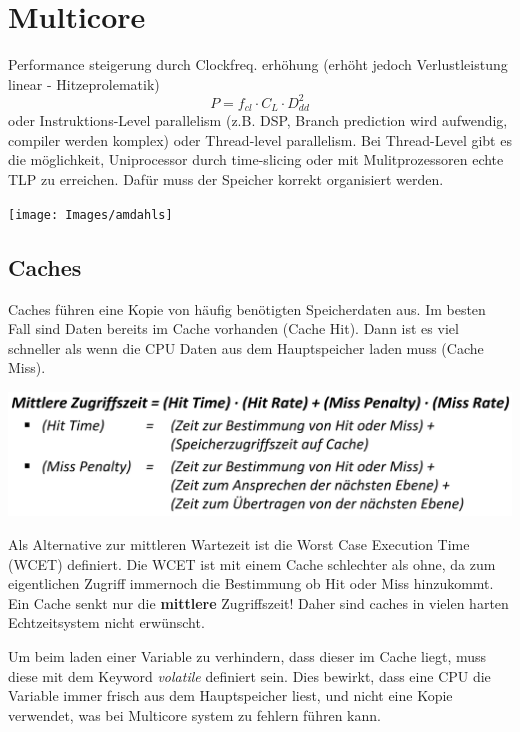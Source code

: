 \section{Multicore}
Performance steigerung durch Clockfreq. erhöhung (erhöht jedoch Verlustleistung linear - Hitzeprolematik)
\[ P = f_{cl} \cdot C_L \cdot D_{dd}^2 \]
oder Instruktions-Level parallelism (z.B. DSP, Branch prediction wird aufwendig, compiler werden komplex) oder Thread-level parallelism. Bei Thread-Level gibt es die möglichkeit, Uniprocessor durch time-slicing oder mit Mulitprozessoren echte TLP zu erreichen. Dafür muss der Speicher korrekt organisiert werden.

\begin{center}
	\texttt{[image: Images/amdahls]}
\end{center}

\subsection{Caches}
Caches führen eine Kopie von häufig benötigten Speicherdaten aus. Im besten Fall sind Daten bereits im Cache vorhanden (Cache Hit). Dann ist es viel schneller als wenn die CPU Daten aus dem Hauptspeicher laden muss (Cache Miss). 
\begin{center}
	\includegraphics[width=\columnwidth]{Images/mittlerewartezeit}
\end{center}

Als Alternative zur mittleren Wartezeit ist die Worst Case Execution Time (WCET) definiert. Die WCET ist mit einem Cache schlechter als ohne, da zum eigentlichen Zugriff immernoch die Bestimmung ob Hit oder Miss hinzukommt. Ein Cache senkt nur die \textbf{mittlere} Zugriffszeit! Daher sind caches in vielen harten Echtzeitsystem nicht erwünscht.

Um beim laden einer Variable zu verhindern, dass dieser im Cache liegt, muss diese mit dem Keyword \textit{volatile} definiert sein. Dies bewirkt, dass eine CPU die Variable immer frisch aus dem Hauptspeicher liest, und nicht eine Kopie verwendet, was bei Multicore system zu fehlern führen kann.